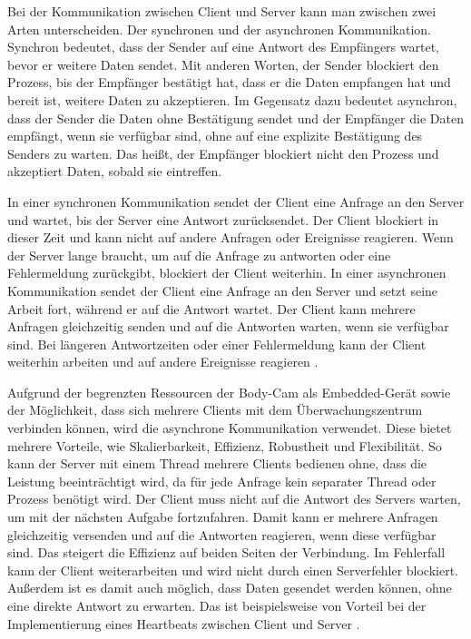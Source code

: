 \documentclass[thesis.tex]{subfiles}
\begin{document}
Bei der Kommunikation zwischen Client und Server kann man zwischen zwei Arten unterscheiden.
Der synchronen und der asynchronen Kommunikation.
Synchron bedeutet, dass der Sender auf eine Antwort des Empfängers wartet, bevor er weitere Daten sendet.
Mit anderen Worten, der Sender blockiert den Prozess, bis der Empfänger bestätigt hat, dass er die Daten empfangen hat und bereit ist, weitere Daten zu akzeptieren.
Im Gegensatz dazu bedeutet asynchron, dass der Sender die Daten ohne Bestätigung sendet und der Empfänger die Daten empfängt, wenn sie verfügbar sind, ohne auf eine explizite Bestätigung des Senders zu warten.
Das heißt, der Empfänger blockiert nicht den Prozess und akzeptiert Daten, sobald sie eintreffen.

In einer synchronen Kommunikation sendet der Client eine Anfrage an den Server und wartet, bis der Server eine Antwort zurücksendet.
Der Client blockiert in dieser Zeit und kann nicht auf andere Anfragen oder Ereignisse reagieren.
Wenn der Server lange braucht, um auf die Anfrage zu antworten oder eine Fehlermeldung zurückgibt, blockiert der Client weiterhin.
In einer asynchronen Kommunikation sendet der Client eine Anfrage an den Server und setzt seine Arbeit fort, während er auf die Antwort wartet.
Der Client kann mehrere Anfragen gleichzeitig senden und auf die Antworten warten, wenn sie verfügbar sind.
Bei längeren Antwortzeiten oder einer Fehlermeldung kann der Client weiterhin arbeiten und auf andere Ereignisse reagieren
\cite[vgl.~S.~1-3][]{lim2019directly}.

Aufgrund der begrenzten Ressourcen der Body-Cam als Embedded-Gerät sowie der Möglichkeit, dass sich mehrere Clients mit dem Überwachungszentrum verbinden können, wird die asynchrone Kommunikation verwendet.
Diese bietet mehrere Vorteile, wie Skalierbarkeit, Effizienz, Robustheit und Flexibilität.
So kann der Server mit einem Thread mehrere Clients bedienen ohne, dass die Leistung beeinträchtigt wird, da für jede Anfrage kein separater Thread oder Prozess benötigt wird.
Der Client muss nicht auf die Antwort des Servers warten, um mit der nächsten Aufgabe fortzufahren.
Damit kann er mehrere Anfragen gleichzeitig versenden und auf die Antworten reagieren, wenn diese verfügbar sind.
Das steigert die Effizienz auf beiden Seiten der Verbindung.
Im Fehlerfall kann der Client weiterarbeiten und wird nicht durch einen Serverfehler blockiert.
Außerdem ist es damit auch möglich, dass Daten gesendet werden können, ohne eine direkte Antwort zu erwarten.
Das ist beispielsweise von Vorteil bei der Implementierung eines Heartbeats zwischen Client und Server
\cite[]{whyAsync,thinkAsync}.
\end{document}

